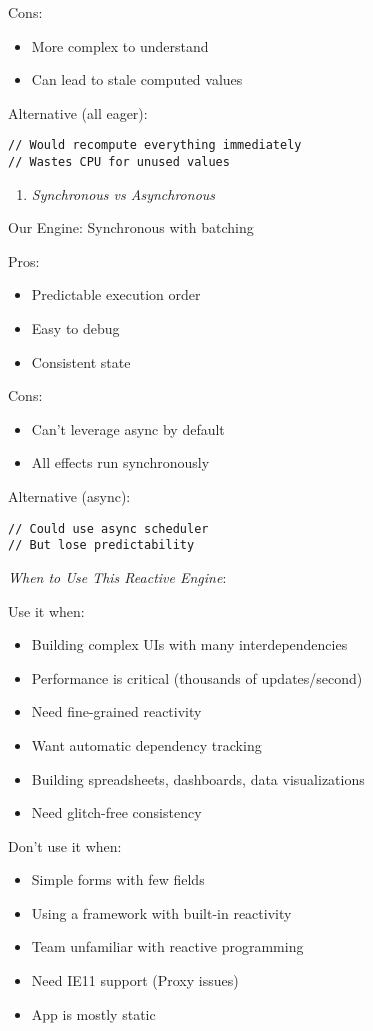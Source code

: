 \documentclass[11pt]{article}
\begin{document}
Cons:
\begin{itemize}
\item More complex to understand
\item Can lead to stale computed values
\end{itemize}

Alternative (all eager):
\begin{verbatim}
// Would recompute everything immediately
// Wastes CPU for unused values
\end{verbatim}

\begin{enumerate}
\item \emph{Synchronous vs Asynchronous}
\end{enumerate}

Our Engine: Synchronous with batching

Pros:
\begin{itemize}
\item Predictable execution order
\item Easy to debug
\item Consistent state
\end{itemize}

Cons:
\begin{itemize}
\item Can't leverage async by default
\item All effects run synchronously
\end{itemize}

Alternative (async):
\begin{verbatim}
// Could use async scheduler
// But lose predictability
\end{verbatim}

\emph{When to Use This Reactive Engine}:

Use it when:
\begin{itemize}
\item Building complex UIs with many interdependencies
\item Performance is critical (thousands of updates/second)
\item Need fine-grained reactivity
\item Want automatic dependency tracking
\item Building spreadsheets, dashboards, data visualizations
\item Need glitch-free consistency
\end{itemize}

Don't use it when:
\begin{itemize}
\item Simple forms with few fields
\item Using a framework with built-in reactivity
\item Team unfamiliar with reactive programming
\item Need IE11 support (Proxy issues)
\item App is mostly static
\end{itemize}
\end{document}

